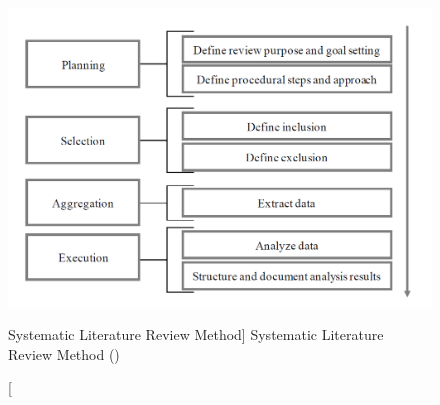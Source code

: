 \begin{figure}[ht]
    \includegraphics[width=0.8\linewidth]{images/methodology/litSearc.png}\centering
    \caption
    [Systematic Literature Review Method]
    {Systematic Literature Review Method (\cite{Okoli2010AResearch})}
    \label{fig:litSearch}
\end{figure}

